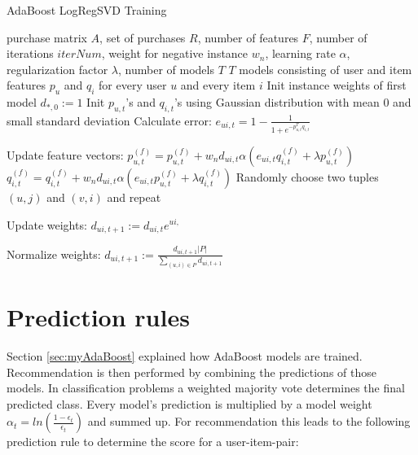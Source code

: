 \documentclass[10pt]{reportMaster}
\begin{document}
\begin{algorithm}
	\caption{AdaBoost LogRegSVD Training}
	\label{alg:AdaBoostLogRegSVDTraining}
	\begin{algorithmic}[1]
		\Require purchase matrix $A$, set of purchases $R$, number of features $F$, number of iterations $iterNum$, weight for negative instance $w_n$, learning rate $\alpha$, regularization factor $\lambda$, number of models $T$
		\Ensure $T$ models consisting of user and item features $p_u$ and $q_i$ for every user $u$ and every item $i$
		\State Init instance weights of first model $d_{*,0} := 1$
				\State Init $p_{u,t}$'s and $q_{i,t}$'s using Gaussian distribution with mean $0$ and small standard deviation
					\State Calculate error:
					\State $e_{ui,t} = 1 - \frac{1}{1 + e^{-p_{u,t}^Tq_{i,t}}}$
					
					\State Update feature vectors:
						\State $p_{u,t}^{(f)} = p_{u,t}^{(f)} + w_n d_{ui,t} \alpha (e_{ui, t} q_{i,t}^{(f)} + \lambda p_{u,t}^{(f)})$
						\State $q_{i,t}^{(f)} = q_{i,t}^{(f)} + w_n d_{ui,t} \alpha (e_{ui, t} p_{u,t}^{(f)} + \lambda q_{i,t}^{(f)})$
					\EndFor	
					\State Randomly choose two tuples $(u,j)$ and $(v,i)$ and repeat
				\EndFor
			\EndFor
			
			\State Update weights:
				\State $d_{ui,t+1} := d_{ui,t} e^{ui,}$
			\EndFor
			
			\State Normalize weights:
			\State $d_{ui,t+1} := \frac{d_{ui,t+1} |P|}{\sum_{(u,i) \in P}{d_{ui, t+1}}}$
			\EndFor 
		\EndFor
		
		
	\end{algorithmic}	
\end{algorithm}


\section{Prediction rules}
\label{sec:predictionRules}

Section \ref{sec:myAdaBoost} explained how AdaBoost models are trained.
Recommendation is then performed by combining the predictions of those models.
In classification problems a weighted majority vote determines the final predicted class.
Every model's prediction is multiplied by a model weight $\alpha_t = ln(\frac{1-\epsilon_t}{\epsilon_t})$ and summed up.
For recommendation this leads to the following prediction rule to determine the score for a user-item-pair:
\end{document}
